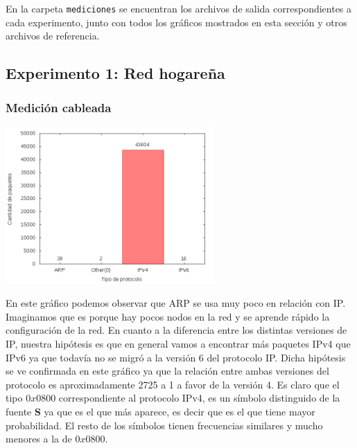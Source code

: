 En la carpeta \texttt{mediciones} se encuentran los archivos de salida correspondientes a cada
experimento, junto con todos los gráficos mostrados en esta sección y otros archivos de referencia.

\subsection{Experimento 1: Red hogareña}
\subsubsection{Medición cableada}

\begin{center}
\includegraphics[width=8cm]{../mediciones/home-eth-10/home-eth-10Protocolos.png}
\end{center}

En este gráfico podemos observar que ARP se usa muy poco en relación con IP. Imaginamos que es porque hay pocos nodos en la red y se aprende rápido la configuración de la red.
En cuanto a la diferencia entre los distintas versiones de IP, nuestra hipótesis es que en general vamos a encontrar más paquetes IPv4 que IPv6 ya que todavía no se migró a la versión 6 del protocolo IP.
Dicha hipótesis se ve confirmada en este gráfico ya que la relación entre ambas versiones del protocolo es aproximadamente 2725 a 1 a favor de la versión 4.
Es claro que el tipo $0x0800$ correspondiente al protocolo IPv4, es un símbolo distinguido de la fuente \textbf{S} ya que es el que más aparece,
es decir que es el que tiene mayor probabilidad. El resto de los símbolos tienen frecuencias similares y mucho menores a la de $0x0800$.

